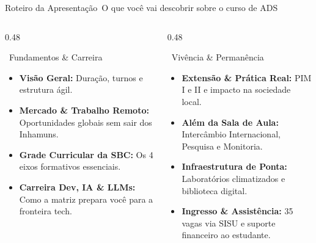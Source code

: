 \begin{frame}{Roteiro da Apresentação}{\faListUl\ O que você vai descobrir sobre o curso de ADS}
  \begin{columns}[t]
    \begin{column}{0.48\textwidth}
      \begin{moderncard}{\faCompass\ Fundamentos \& Carreira}
        \begin{itemize}\setlength{\itemsep}{0.2em}\footnotesize
          \item \textbf{Visão Geral:} Duração, turnos e estrutura ágil.
          \item \textbf{Mercado \& Trabalho Remoto:} Oportunidades globais sem sair dos Inhamuns.
          \item \textbf{Grade Curricular da SBC:} Os 4 eixos formativos essenciais.
          \item \textbf{Carreira Dev, IA \& LLMs:} Como a matriz prepara você para a fronteira tech.
        \end{itemize}
      \end{moderncard}
    \end{column}
    
    \begin{column}{0.48\textwidth}
      \begin{moderncard}{\faGlobe\ Vivência \& Permanência}
        \begin{itemize}\setlength{\itemsep}{0.2em}\footnotesize
          \item \textbf{Extensão \& Prática Real:} PIM I e II e impacto na sociedade local.
          \item \textbf{Além da Sala de Aula:} Intercâmbio Internacional, Pesquisa e Monitoria.
          \item \textbf{Infraestrutura de Ponta:} Laboratórios climatizados e biblioteca digital.
          \item \textbf{Ingresso \& Assistência:} 35 vagas via SISU e suporte financeiro ao estudante.
        \end{itemize}
      \end{moderncard}
    \end{column}
  \end{columns}
\end{frame}

